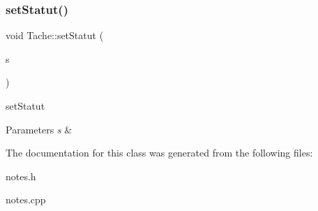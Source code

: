 \subsubsection{\texorpdfstring{set\+Statut()}{setStatut()}}
{\footnotesize\ttfamily void Tache\+::set\+Statut (\begin{DoxyParamCaption}\item[{const Q\+String \&}]{s }\end{DoxyParamCaption})\hspace{0.3cm}{\ttfamily [inline]}}



set\+Statut 


\begin{DoxyParams}{Parameters}
{\em s} & \\
\hline
\end{DoxyParams}


The documentation for this class was generated from the following files\+:\begin{DoxyCompactItemize}
\item 
notes.\+h\item 
notes.\+cpp\end{DoxyCompactItemize}
